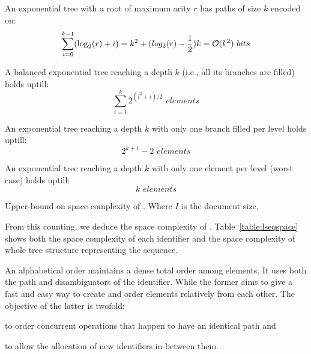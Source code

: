 \begin{asparadesc}
  An exponential tree with a root of maximum arity $r$ has paths of size $k$
  encoded on:
  \begin{equation}
    \sum\limits_{i=0}^{k-1}(\log_2(r)+i) =k^2+(log_2(r)-{1\over{2}})k =
    \mathcal{O}(k^2) \,\, bits
  \end{equation}

  A balanced exponential tree reaching a depth $k$ (i.e., all its branches are
  filled) holds uptill:
  \begin{equation}
    \sum\limits_{i=1}^{k} {2^{(i^2+i)/2}} \,\, elements
  \end{equation}

  An exponential tree reaching a depth $k$ with only one branch filled per level
  holds uptill:
  \begin{equation}
    2^{k+1}-2 \,\, elements
  \end{equation}

  An exponential tree reaching a depth $k$ with only one element per level
  (worst case) holds uptill: 
  \begin{equation}
    k \,\, elements
  \end{equation}

  \begin{table}
    \centering
    
    \caption{\label{table:lseqspace}
      Upper-bound on space complexity of \LSEQ. Where $I$ is the document size.}
  \end{table}
  
  From this counting, we deduce the space complexity of
  \LSEQ. Table~\ref{table:lseqspace} shows both the space complexity of each
  identifier and the space complexity of whole tree structure representing the
  sequence.
  
  An alphabetical order maintains a dense total order among elements. It uses
  both the path and disambiguators of the identifier. While the former aims to
  give a fast and easy way to create and order elements relatively from each
  other. The objective of the latter is twofold:
  \begin{inparaenum}[(i)]
  \item to order concurrent operations that happen to have an identical path and
  \item to allow the allocation of new identifiers in-between them.
  \end{inparaenum}


\end{asparadesc}
